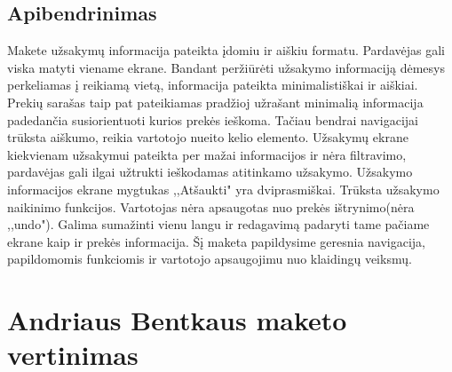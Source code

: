 \documentclass[oneside]{VUMIFPSkursinis}
\begin{document}
	\subsection{Apibendrinimas}
Makete užsakymų informacija pateikta įdomiu ir aiškiu formatu. Pardavėjas gali viska matyti viename ekrane. Bandant peržiūrėti užsakymo informaciją dėmesys perkeliamas į reikiamą vietą, informacija pateikta minimalistiškai ir aiškiai. Prekių sarašas taip pat pateikiamas pradžioj užrašant minimalią informacija padedančia susiorientuoti kurios prekės ieškoma. Tačiau bendrai navigacijai trūksta aiškumo, reikia vartotojo nueito kelio elemento. Užsakymų ekrane kiekvienam užsakymui pateikta per mažai informacijos ir nėra filtravimo, pardavėjas gali ilgai užtrukti ieškodamas atitinkamo užsakymo. Užsakymo informacijos ekrane mygtukas ,,Atšaukti" yra dviprasmiškai. Trūksta užsakymo naikinimo funkcijos. Vartotojas nėra apsaugotas nuo prekės ištrynimo(nėra ,,undo"). Galima sumažinti vienu langu ir redagavimą padaryti tame pačiame ekrane kaip ir prekės informacija. Šį maketa papildysime geresnia navigacija, papildomomis funkciomis ir vartotojo apsaugojimu nuo klaidingų veiksmų.


\iffalse XXXXXXXXXXXXXXXXXXXXXXXXXXXXXXXXXXXXXXXXXXXXXXXXXXXXXXXXXXXXXXXXXXXXXXXXXXXXXXXXXXXXXXXXXXXXXXXXXXXXXXXXXXXXXXXXXXXXXXXXXXXXXXXXXXXXXXX \fi

\section{Andriaus Bentkaus maketo vertinimas}
\end{document}
